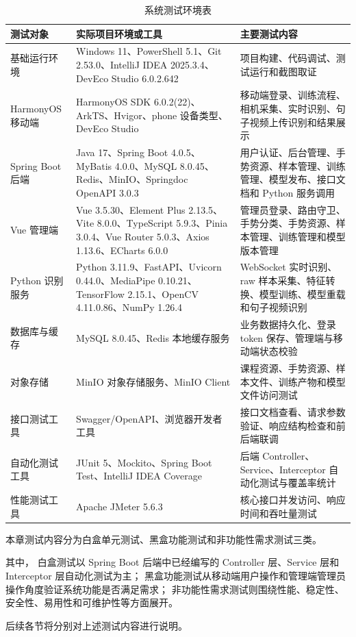 \begin{longtable}{L{0.18\textwidth} L{0.45\textwidth} L{0.29\textwidth}}
  \caption{系统测试环境表}
  \label{tab:chapter07-test-environment}\\
  \toprule
  测试对象 & 实际项目环境或工具 & 主要测试内容 \\
  \midrule
  基础运行环境 & Windows 11、PowerShell 5.1、Git 2.53.0、IntelliJ IDEA 2025.3.4、DevEco Studio 6.0.2.642 & 项目构建、代码调试、测试运行和截图取证 \\
  HarmonyOS 移动端 & HarmonyOS SDK 6.0.2(22)、ArkTS、Hvigor、phone 设备类型、DevEco Studio & 移动端登录、训练流程、相机采集、实时识别、句子视频上传识别和结果展示 \\
  Spring Boot 后端 & Java 17、Spring Boot 4.0.5、MyBatis 4.0.0、MySQL 8.0.45、Redis、MinIO、Springdoc OpenAPI 3.0.3 & 用户认证、后台管理、手势资源、样本管理、训练管理、模型发布、接口文档和 Python 服务调用 \\
  Vue 管理端 & Vue 3.5.30、Element Plus 2.13.5、Vite 8.0.0、TypeScript 5.9.3、Pinia 3.0.4、Vue Router 5.0.3、Axios 1.13.6、ECharts 6.0.0 & 管理员登录、路由守卫、手势分类、手势资源、样本管理、训练管理和模型版本管理 \\
  Python 识别服务 & Python 3.11.9、FastAPI、Uvicorn 0.44.0、MediaPipe 0.10.21、TensorFlow 2.15.1、OpenCV 4.11.0.86、NumPy 1.26.4 & WebSocket 实时识别、raw 样本采集、特征转换、模型训练、模型重载和句子视频识别 \\
  数据库与缓存 & MySQL 8.0.45、Redis 本地缓存服务 & 业务数据持久化、登录 token 保存、管理端与移动端状态校验 \\
  对象存储 & MinIO 对象存储服务、MinIO Client & 课程资源、手势资源、样本文件、训练产物和模型文件访问测试 \\
  接口测试工具 & Swagger/OpenAPI、浏览器开发者工具 & 接口文档查看、请求参数验证、响应结构检查和前后端联调 \\
  自动化测试工具 & JUnit 5、Mockito、Spring Boot Test、IntelliJ IDEA Coverage & 后端 Controller、Service、Interceptor 自动化测试与覆盖率统计 \\
  性能测试工具 & Apache JMeter 5.6.3 & 核心接口并发访问、响应时间和吞吐量测试 \\
  \bottomrule
\end{longtable}

本章测试内容分为白盒单元测试、黑盒功能测试和非功能性需求测试三类。

其中，
白盒测试以 Spring Boot 后端中已经编写的 Controller 层、Service 层和 Interceptor 层自动化测试为主；
黑盒功能测试从移动端用户操作和管理端管理员操作角度验证系统功能是否满足需求；
非功能性需求测试则围绕性能、稳定性、安全性、易用性和可维护性等方面展开。

后续各节将分别对上述测试内容进行说明。